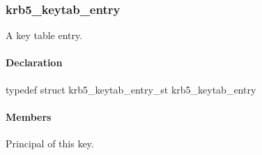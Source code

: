 \documentclass[letterpaper,10pt,english]{sphinxmanual}
\begin{document}
\begin{fulllineitems}
\label{appdev/refs/types/krb5_keyblock:krb5_keyblock.contents}
\end{fulllineitems}



\subsubsection{krb5\_keytab\_entry}
\label{appdev/refs/types/krb5_keytab_entry:krb5-keytab-entry}\label{appdev/refs/types/krb5_keytab_entry:krb5-keytab-entry-struct}\label{appdev/refs/types/krb5_keytab_entry::doc}

\begin{fulllineitems}
\label{appdev/refs/types/krb5_keytab_entry:krb5_keytab_entry}
\end{fulllineitems}


A key table entry.


\paragraph{Declaration}
\label{appdev/refs/types/krb5_keytab_entry:declaration}
typedef struct krb5\_keytab\_entry\_st  krb5\_keytab\_entry


\paragraph{Members}
\label{appdev/refs/types/krb5_keytab_entry:members}

\begin{fulllineitems}
\label{appdev/refs/types/krb5_keytab_entry:krb5_keytab_entry.magic}
\end{fulllineitems}


\begin{fulllineitems}
\label{appdev/refs/types/krb5_keytab_entry:krb5_keytab_entry.principal}
Principal of this key.

\end{fulllineitems}
\end{document}
